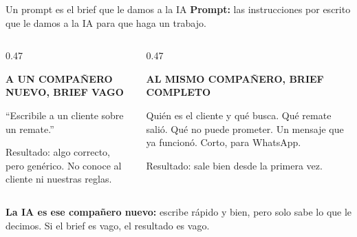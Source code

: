 \documentclass[aspectratio=169,10pt]{beamer}
\begin{document}
\begin{frame}{Un prompt es el brief que le damos a la IA}
\textbf{Prompt:} las instrucciones por escrito que le damos a la IA para que
haga un trabajo.

\vspace{0.25cm}
\begin{columns}[T,onlytextwidth]
\begin{column}{0.47\textwidth}
\begin{caja}
{\scriptsize\bfseries\color{mitGris}A UN COMPAÑERO NUEVO, BRIEF VAGO\par}
\vspace{4pt}
\enquote{Escribile a un cliente sobre un remate.}

\vspace{6pt}
{\small\color{mitGris}Resultado: algo correcto, pero genérico. No conoce al
cliente ni nuestras reglas.\par}
\end{caja}
\end{column}
\begin{column}{0.47\textwidth}
\begin{caja}[mitRojo]
{\scriptsize\bfseries\color{mitRojo}AL MISMO COMPAÑERO, BRIEF COMPLETO\par}
\vspace{4pt}
\small Quién es el cliente y qué busca. Qué remate salió. Qué no puede
prometer. Un mensaje que ya funcionó. Corto, para WhatsApp.

\vspace{6pt}
{\small\color{mitGris}Resultado: sale bien desde la primera vez.\par}
\end{caja}
\end{column}
\end{columns}

\vspace{0.45cm}
\begin{destacado}
\textbf{La IA es ese compañero nuevo:} escribe rápido y bien, pero solo sabe
lo que le decimos. Si el brief es vago, el resultado es vago.
\end{destacado}
\end{frame}
\end{document}

